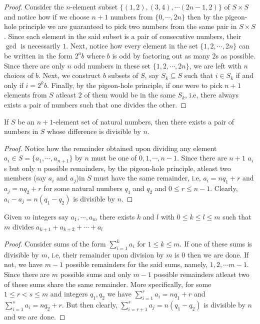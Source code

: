 \begin{proof}
Consider the $n$-element subset $\{\left( 1,2 \right), \left( 3,4 \right), \cdots \left( 2n-1,2 \right)\}$ of $S\times S$ and notice how if we choose $n+1$ numbers from $\{0,\cdots,2n\}$ then by the pigeon-hole principle we are guaranteed to pick two numbers from the same pair in $S\times S$. Since each element in the said subset is a pair of consecutive numbers, their $\gcd$ is necessarily $1$. Next, notice how every element in the set $\{1,2,\cdots,2n\}$ can be written in the form $2^ab$ where $b$ is odd by factoring out as many $2$s as possible. Since there are only $n$ odd numbers in these set $\{1,2,\cdots,2n\}$, we are left with $n$ choices of $b$. Next, we construct $b$ subsets of $S$, say $S_k\subseteq S$ such that $i\in S_k$ if and only if $i=2^kb$. Finally, by the pigeon-hole principle, if one were to pick $n+1$ elements from $S$ atleast $2$ of them would be in the same $S_k$, i.e, there always exists a pair of numbers such that one divides the other.
\end{proof}
\begin{claim}
If $S$ be an $n+1$-element set of natural numbers, then there exists a pair of numbers in $S$ whose difference is divisible by $n$.
\end{claim}
\begin{proof}
Notice how the remainder obtained upon dividing any element $a_i\in S=\{a_1,\cdots,a_{n+1}\}$ by $n$ must be one of $0,1,\cdots,n-1$. Since there are $n+1$ $a_i$s but only $n$ possible remainders, by the pigeon-hole principle, atleast two members (say $a_i$ and $a_j$)in $S$ must have the same remainder, i.e, $a_i = nq_1 + r$ and $a_j = nq_2 + r$ for some natural numbers $q_1$ and $q_2$ and $0\leq r\leq n-1$. Clearly, $a_i-a_j = n(q_1-q_2)$ is divisible by $n$.
\end{proof}
\begin{claim}
Given $m$ integers say $a_{1},\cdots,a_{m}$ there exists $k$ and $l$ with  $0\leq k\leq l\leq m$ such that $m$ divides $a_{k+1}+a_{k+2}+\cdots+a_{l}$
\end{claim}
\begin{proof}
Consider sums of the form $\sum_{i=1}^{k}a_i$ for $1\leq k\leq m$. If one of these sums is divisible by $m$, i.e, their remainder upon division by $m$ is $0$ then we are done. If not, we have $m-1$ possible remainders for the said sums, namely, $1,2,\cdots m-1$. Since there are $m$ possible sums and only $m-1$ possible remainders atleast two of these sums share the same remainder. More specifically, for some $1\leq r<s\leq m$ and integers $q_1,q_2$ we have $\sum_{i=1}^{r}a_i = nq_1 + r$ and $\sum_{i=1}^{s}a_i = nq_2 + r$. But then clearly, $\sum_{i=r+1}^{s}a_j = n(q_1-q_2)$ is divisible by $n$ and we are done.
\end{proof}
